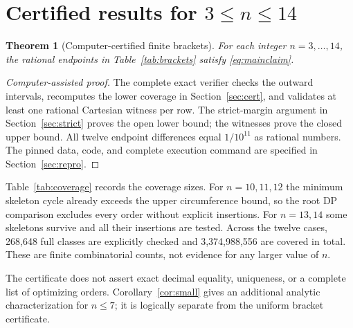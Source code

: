 \documentclass[11pt]{article}
\newtheorem{theorem}{Theorem}[section]
\theoremstyle{definition}
\theoremstyle{remark}
\newcommand{\Rstar}{R^*}
\begin{document}
\section{Certified results for \texorpdfstring{$3\le n\le14$}{3 <= n <= 14}}\label{sec:results}
\begin{theorem}[Computer-certified finite brackets]\label{thm:brackets}
For each integer $n=3,\ldots,14$, the rational endpoints in
Table~\ref{tab:brackets} satisfy \eqref{eq:mainclaim}.
\end{theorem}
\begin{proof}[Computer-assisted proof]
The complete exact verifier checks the outward intervals, recomputes the
lower coverage in Section~\ref{sec:cert}, and validates at least one
rational Cartesian witness per row. The strict-margin argument in
Section~\ref{sec:strict} proves the open lower bound; the witnesses prove
the closed upper bound. All twelve endpoint differences equal $1/10^{11}$
as rational numbers. The pinned data, code, and complete execution command
are specified in Section~\ref{sec:repro}.
\end{proof}

\begin{table}[htbp]\centering
\caption{Exact global brackets. Every decimal is a rational endpoint;
the certified statement is $L_n<\Rstar(n)\le U_n$. The last column counts
supplied feasible upper witnesses, not exact optimal orders.}
\label{tab:brackets}

\end{table}

Table~\ref{tab:coverage} records the coverage sizes. For $n=10,11,12$
the minimum skeleton cycle already exceeds the upper circumference bound,
so the root DP comparison excludes every order without explicit insertions.
For $n=13,14$ some skeletons survive and all their insertions are tested.
Across the twelve cases, 268,648 full classes are explicitly checked and
3,374,988,556 are covered in total. These are finite combinatorial counts,
not evidence for any larger value of $n$.

\begin{table}[htbp]\centering
\caption{Complete lower coverage recomputed by the exact verifier.
An en dash indicates direct full-order enumeration. Zero explicit orders
at $n=10,11,12$ means the root skeleton bound excludes the whole domain.}
\label{tab:coverage}

\end{table}

The certificate does not assert exact decimal equality, uniqueness, or
a complete list of optimizing orders. Corollary~\ref{cor:small} gives
an additional analytic characterization for $n\le7$; it is logically
separate from the uniform bracket certificate.
\end{document}
